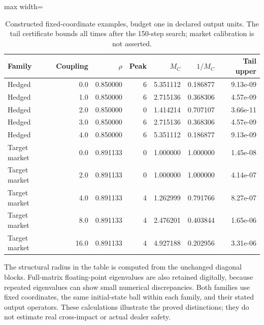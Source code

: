 \begin{table}[htbp]
\centering\small
\caption{Constructed fixed-coordinate examples, budget one in declared output units. The tail certificate bounds all times after the 150-step search; market calibration is not asserted.}\label{tab:risk_contract_examples}
\begin{adjustbox}{max width=\textwidth}
\begin{tabular}{lrrrrrr}\toprule
Family & Coupling & $\rho$ & Peak & $M_C$ & $1/M_C$ & Tail upper\\\midrule
Hedged & 0.0 & 0.850000 & 6 & 5.351112 & 0.186877 & 9.13e-09\\
Hedged & 1.0 & 0.850000 & 6 & 2.715136 & 0.368306 & 4.57e-09\\
Hedged & 2.0 & 0.850000 & 0 & 1.414214 & 0.707107 & 3.66e-11\\
Hedged & 3.0 & 0.850000 & 6 & 2.715136 & 0.368306 & 4.57e-09\\
Hedged & 4.0 & 0.850000 & 6 & 5.351112 & 0.186877 & 9.13e-09\\
Target market & 0.0 & 0.891133 & 0 & 1.000000 & 1.000000 & 1.45e-08\\
Target market & 2.0 & 0.891133 & 0 & 1.000000 & 1.000000 & 4.14e-07\\
Target market & 4.0 & 0.891133 & 4 & 1.262999 & 0.791766 & 8.27e-07\\
Target market & 8.0 & 0.891133 & 4 & 2.476201 & 0.403844 & 1.65e-06\\
Target market & 16.0 & 0.891133 & 4 & 4.927188 & 0.202956 & 3.31e-06\\
\bottomrule\end{tabular}
\end{adjustbox}
\end{table}
The structural radius in the table is computed from the unchanged diagonal blocks. Full-matrix floating-point eigenvalues are also retained digitally, because repeated eigenvalues can show small numerical discrepancies. Both families use fixed coordinates, the same initial-state ball within each family, and their stated output operators. These calculations illustrate the proved distinctions; they do not estimate real cross-impact or actual dealer safety.
